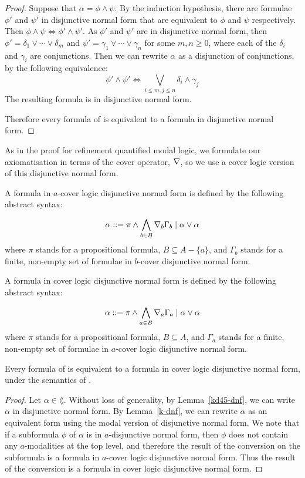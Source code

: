 \begin{proof}
Suppose that $\alpha = \phi \land \psi$. By the induction hypothesis, there are
formulae $\phi'$ and $\psi'$ in disjunctive normal form that are equivalent to
$\phi$ and $\psi$ respectively. Then $\phi \land \psi \iff \phi' \land \psi'$.
As $\phi'$ and $\psi'$ are in disjunctive normal form, then $\phi' = \delta_1
\lor \cdots \lor \delta_m$ and $\psi' = \gamma_1 \lor \cdots \lor \gamma_n$ for
some $m, n \geq 0$, where each of the $\delta_i$ and $\gamma_i$ are
conjunctions. Then we can rewrite $\alpha$ as a disjunction of conjunctions, by
the following equivalence:
$$
\phi' \land \psi' \iff \bigvee_{i \leq m, j \leq n} \delta_i \land \gamma_j
$$
The resulting formula is in disjunctive normal form.

Therefore every formula of \lang{} is equivalent to a formula in disjunctive
normal form.
\end{proof}

As in the proof for refinement quantified modal logic, we formulate our
axiomatisation in terms of the cover operator, $\nabla$, so we use a cover
logic version of this disjunctive normal form.

\begin{definition}
A formula in $a$-cover logic disjunctive normal form is defined by the following
abstract syntax:

$$
\alpha ::= \pi \land \bigwedge_{b \in B} \nabla_b \Gamma_b \mid
\alpha \lor \alpha
$$
where $\pi$ stands for a propositional formula, $B \subseteq A - \{a\}$, and
$\Gamma_b$ stands for a finite, non-empty set of formulae in $b$-cover
disjunctive normal form.

A formula in cover logic disjunctive normal form is defined by the following abstract
syntax:

$$
\alpha ::= \pi \land \bigwedge_{a \in B} \nabla_a \Gamma_a \mid
\alpha \lor \alpha
$$
where $\pi$ stands for a propositional formula, $B \subseteq A$, and $\Gamma_a$
stands for a finite, non-empty set of formulae in $a$-cover logic disjunctive normal
form.
\end{definition}

\begin{lemma}
Every formula of \lang{} is equivalent to a formula in cover logic disjunctive normal
form, under the semantics of \logicKD{}.
\end{lemma}

\begin{proof}
Let $\alpha \in \lang$. Without loss of generality, by Lemma~\ref{kd45-dnf}, we
can write $\alpha$ in disjunctive normal form. By Lemma~\ref{k-dnf}, we can
rewrite $\alpha$ as an equivalent form using the modal version of disjunctive
normal form. We note that if a subformula $\phi$ of $\alpha$ is in
$a$-disjunctive normal form, then $\phi$ does not contain any $a$-modalities at
the top level, and therefore the result of the conversion on the subformula is
a formula in $a$-cover logic disjunctive normal form. Thus the result of the
conversion is a formula in cover logic disjunctive normal form.
\end{proof}

